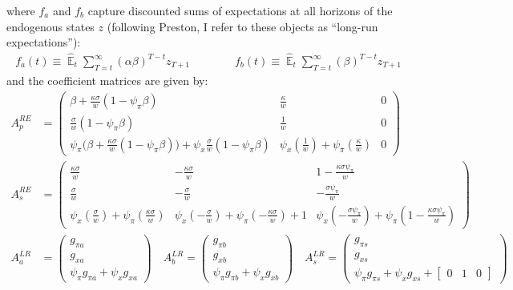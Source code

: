 \documentclass[11pt]{article}
\renewcommand{\[}{\begin{equation}}
\renewcommand{\]}{\end{equation}}
\DeclareMathOperator{\E}{\mathbb{E}}
\begin{document}
 where $f_a$ and $f_b$ capture discounted sums of expectations at all horizons of the endogenous states $z$ (following Preston, I refer to these objects as ``long-run expectations''):
  \begin{align}
f_a(t)  \equiv  \hat{\E}_t\sum_{T=t}^{\infty} (\alpha\beta)^{T-t } z_{T+1} \quad \quad \quad \quad f_b(t)  \equiv \hat{\E}_t\sum_{T=t}^{\infty} (\beta)^{T-t } z_{T+1} \label{fafb}
\end{align}
and the coefficient matrices are given by:
\begin{align}
A_p^{RE} & = \begin{pmatrix} \beta + \frac{\kappa\sigma}{w} (1-\psi_{\pi}\beta) & \frac{\kappa}{w} & 0\\
 \frac{\sigma}{w} (1-\psi_{\pi}\beta) & \frac{1}{w}& 0\\ 
\psi_{\pi}\big( \beta + \frac{\kappa\sigma}{w} (1-\psi_{\pi}\beta) \big) +\psi_x\frac{\sigma}{w} (1-\psi_{\pi}\beta)&  \psi_x (\frac{1}{w})+ \psi_{\pi} (\frac{\kappa}{w})& 0\end{pmatrix} \quad \\
A_s^{RE} &= \begin{pmatrix}   \frac{\kappa\sigma}{w}  &-\frac{\kappa\sigma}{w}  & 1-\frac{\kappa\sigma\psi_{\pi}}{w}\\
 \frac{ \sigma}{w} &  -\frac{\sigma}{w} & -\frac{\sigma\psi_{\pi}}{w}\\ 
 \psi_x( \frac{\sigma}{w}) + \psi_{\pi}( \frac{\kappa\sigma}{w}) & \psi_x(- \frac{\sigma}{w}) + \psi_{\pi}(- \frac{\kappa\sigma}{w}) +1 &  \psi_x(-\frac{\sigma\psi_{\pi}}{w}) + \psi_{\pi}( 1-\frac{\kappa\sigma\psi_{\pi}}{w})\end{pmatrix}  
\\
A_a^{LR} & = \begin{pmatrix} g_{\pi a} \\ g_{x a} \\ \psi_{\pi}g_{\pi a} + \psi_xg_{x a}
\end{pmatrix}
\quad A_b^{LR} = \begin{pmatrix} g_{\pi b} \\ g_{x b} \\ \psi_{\pi}g_{\pi b} + \psi_xg_{x b}
\end{pmatrix}
 \quad A_s^{LR} = \begin{pmatrix} g_{\pi s} \\ g_{x s} \\ \psi_{\pi}g_{\pi s} + \psi_xg_{x s} + \begin{bmatrix} 0 & 1& 0\end{bmatrix}

\end{pmatrix}
\end{align}
\end{document}
